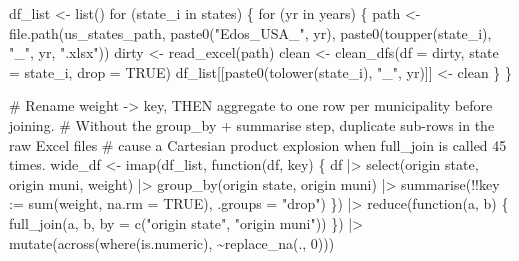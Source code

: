 \documentclass[
  11pt,
  letterpaper,
  DIV=11,
  numbers=noendperiod]{scrartcl}
\newenvironment{Shaded}{}{}
\newcommand{\AttributeTok}[1]{\textcolor[rgb]{0.84,0.23,0.29}{#1}}
\newcommand{\CommentTok}[1]{\textcolor[rgb]{0.42,0.45,0.49}{#1}}
\newcommand{\ConstantTok}[1]{\textcolor[rgb]{0.00,0.36,0.77}{#1}}
\newcommand{\ControlFlowTok}[1]{\textcolor[rgb]{0.84,0.23,0.29}{#1}}
\newcommand{\DecValTok}[1]{\textcolor[rgb]{0.00,0.36,0.77}{#1}}
\newcommand{\FunctionTok}[1]{\textcolor[rgb]{0.44,0.26,0.76}{#1}}
\newcommand{\NormalTok}[1]{\textcolor[rgb]{0.14,0.16,0.18}{#1}}
\newcommand{\OtherTok}[1]{\textcolor[rgb]{0.44,0.26,0.76}{#1}}
\newcommand{\SpecialCharTok}[1]{\textcolor[rgb]{0.00,0.36,0.77}{#1}}
\newcommand{\StringTok}[1]{\textcolor[rgb]{0.01,0.18,0.38}{#1}}
\begin{document}
\begin{Shaded}
\begin{Highlighting}[]
\NormalTok{  df\_list }\OtherTok{\textless{}{-}} \FunctionTok{list}\NormalTok{()}
  \ControlFlowTok{for}\NormalTok{ (state\_i }\ControlFlowTok{in}\NormalTok{ states) \{}
    \ControlFlowTok{for}\NormalTok{ (yr }\ControlFlowTok{in}\NormalTok{ years) \{}
\NormalTok{      path  }\OtherTok{\textless{}{-}} \FunctionTok{file.path}\NormalTok{(us\_states\_path,}
                         \FunctionTok{paste0}\NormalTok{(}\StringTok{"Edos\_USA\_"}\NormalTok{, yr),}
                         \FunctionTok{paste0}\NormalTok{(}\FunctionTok{toupper}\NormalTok{(state\_i), }\StringTok{"\_"}\NormalTok{, yr, }\StringTok{".xlsx"}\NormalTok{))}
\NormalTok{      dirty }\OtherTok{\textless{}{-}} \FunctionTok{read\_excel}\NormalTok{(path)}
\NormalTok{      clean }\OtherTok{\textless{}{-}} \FunctionTok{clean\_dfs}\NormalTok{(}\AttributeTok{df =}\NormalTok{ dirty, }\AttributeTok{state =}\NormalTok{ state\_i, }\AttributeTok{drop =} \ConstantTok{TRUE}\NormalTok{)}
\NormalTok{      df\_list[[}\FunctionTok{paste0}\NormalTok{(}\FunctionTok{tolower}\NormalTok{(state\_i), }\StringTok{"\_"}\NormalTok{, yr)]] }\OtherTok{\textless{}{-}}\NormalTok{ clean}
\NormalTok{    \}}
\NormalTok{  \}}

  \CommentTok{\# Rename weight {-}\textgreater{} key, THEN aggregate to one row per municipality before joining.}
  \CommentTok{\# Without the group\_by + summarise step, duplicate sub{-}rows in the raw Excel files}
  \CommentTok{\# cause a Cartesian product explosion when full\_join is called 45 times.}
\NormalTok{  wide\_df }\OtherTok{\textless{}{-}} \FunctionTok{imap}\NormalTok{(df\_list, }\ControlFlowTok{function}\NormalTok{(df, key) \{}
\NormalTok{    df }\SpecialCharTok{|\textgreater{}}
      \FunctionTok{select}\NormalTok{(}\StringTok{\textasciigrave{}}\AttributeTok{origin state}\StringTok{\textasciigrave{}}\NormalTok{, }\StringTok{\textasciigrave{}}\AttributeTok{origin muni}\StringTok{\textasciigrave{}}\NormalTok{, weight) }\SpecialCharTok{|\textgreater{}}
      \FunctionTok{group\_by}\NormalTok{(}\StringTok{\textasciigrave{}}\AttributeTok{origin state}\StringTok{\textasciigrave{}}\NormalTok{, }\StringTok{\textasciigrave{}}\AttributeTok{origin muni}\StringTok{\textasciigrave{}}\NormalTok{) }\SpecialCharTok{|\textgreater{}}
      \FunctionTok{summarise}\NormalTok{(}\SpecialCharTok{!!}\AttributeTok{key :=} \FunctionTok{sum}\NormalTok{(weight, }\AttributeTok{na.rm =} \ConstantTok{TRUE}\NormalTok{), }\AttributeTok{.groups =} \StringTok{"drop"}\NormalTok{)}
\NormalTok{  \}) }\SpecialCharTok{|\textgreater{}}
    \FunctionTok{reduce}\NormalTok{(}\ControlFlowTok{function}\NormalTok{(a, b) \{}
      \FunctionTok{full\_join}\NormalTok{(a, b, }\AttributeTok{by =} \FunctionTok{c}\NormalTok{(}\StringTok{"origin state"}\NormalTok{, }\StringTok{"origin muni"}\NormalTok{))}
\NormalTok{    \}) }\SpecialCharTok{|\textgreater{}}
    \FunctionTok{mutate}\NormalTok{(}\FunctionTok{across}\NormalTok{(}\FunctionTok{where}\NormalTok{(is.numeric), }\SpecialCharTok{\textasciitilde{}}\FunctionTok{replace\_na}\NormalTok{(., }\DecValTok{0}\NormalTok{)))}


\end{Highlighting}
\end{Shaded}
\end{document}
